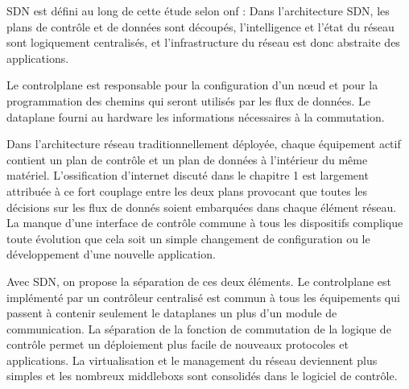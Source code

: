 SDN est défini au long de cette étude  selon \gls{onf} : Dans l'architecture SDN, les plans de contrôle et de données sont découpés, l'intelligence et l'état du réseau sont logiquement centralisés, et l'infrastructure du réseau est donc abstraite des applications. \cite{SDNNewNormONFExecutiveSummary}



Le \gls{controlplane} est responsable pour la configuration d'un nœud et pour la programmation des chemins qui seront utilisés par les flux de données. Le \gls{dataplane} fourni au hardware les informations nécessaires à la commutation. \cite{ImplementationChallengesForSDNBackground}



Dans l'architecture réseau traditionnellement déployée, chaque équipement actif contient un plan de contrôle et un plan de données à l'intérieur du même matériel. L'ossification d'internet discuté dans le chapitre 1 est largement attribuée à ce fort couplage entre les deux plans provocant que toutes les décisions sur les flux de donnés soient embarquées dans chaque élément réseau. La manque d'une interface de contrôle commune à tous les dispositifs complique toute évolution que cela soit un simple changement de configuration ou le développement d'une nouvelle application. \cite{SurveySDNArchi}




Avec SDN, on propose la séparation de ces deux éléments. Le \gls{controlplane} est implémenté par un contrôleur centralisé est commun à tous les équipements qui passent à contenir seulement le \glspl{dataplane} un plus d'un module de communication.  La séparation de la fonction de commutation de la logique de contrôle permet un déploiement plus facile de nouveaux protocoles et applications. La virtualisation et le management du réseau deviennent plus simples et les nombreux \glspl{middlebox} sont consolidés dans le logiciel de contrôle. \cite{SurveySDNArchi} \cite{SDNNewNormONFExecutiveSummary}

